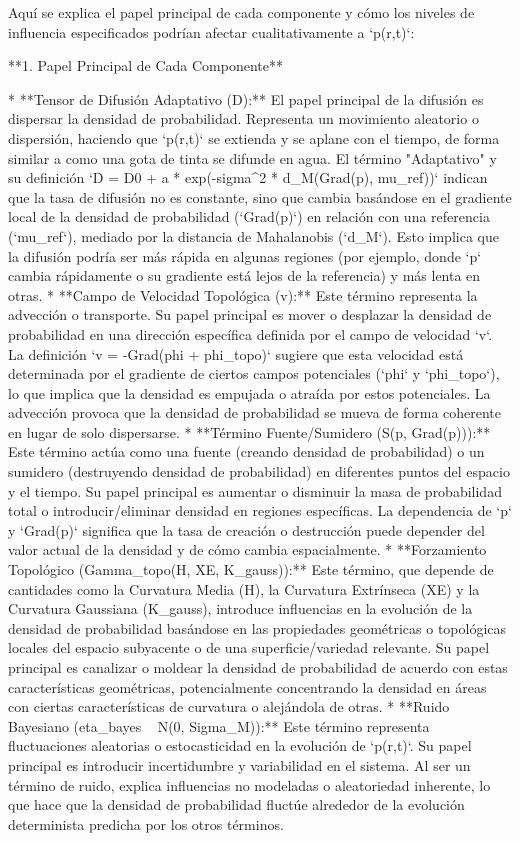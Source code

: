 \documentclass{book}
\begin{document}
Aquí se explica el papel principal de cada componente y cómo los niveles de influencia especificados podrían afectar cualitativamente a `p(r,t)`:

**1. Papel Principal de Cada Componente**

*   **Tensor de Difusión Adaptativo (D):** El papel principal de la difusión es dispersar la densidad de probabilidad. Representa un movimiento aleatorio o dispersión, haciendo que `p(r,t)` se extienda y se aplane con el tiempo, de forma similar a como una gota de tinta se difunde en agua. El término "Adaptativo" y su definición `D = D0 + a * exp(-sigma^2 * d_M(Grad(p), mu_ref))` indican que la tasa de difusión no es constante, sino que cambia basándose en el gradiente local de la densidad de probabilidad (`Grad(p)`) en relación con una referencia (`mu_ref`), mediado por la distancia de Mahalanobis (`d_M`). Esto implica que la difusión podría ser más rápida en algunas regiones (por ejemplo, donde `p` cambia rápidamente o su gradiente está lejos de la referencia) y más lenta en otras.
*   **Campo de Velocidad Topológica (v):** Este término representa la advección o transporte. Su papel principal es mover o desplazar la densidad de probabilidad en una dirección específica definida por el campo de velocidad `v`. La definición `v = -Grad(phi + phi_topo)` sugiere que esta velocidad está determinada por el gradiente de ciertos campos potenciales (`phi` y `phi_topo`), lo que implica que la densidad es empujada o atraída por estos potenciales. La advección provoca que la densidad de probabilidad se mueva de forma coherente en lugar de solo dispersarse.
*   **Término Fuente/Sumidero (S(p, Grad(p))):** Este término actúa como una fuente (creando densidad de probabilidad) o un sumidero (destruyendo densidad de probabilidad) en diferentes puntos del espacio y el tiempo. Su papel principal es aumentar o disminuir la masa de probabilidad total o introducir/eliminar densidad en regiones específicas. La dependencia de `p` y `Grad(p)` significa que la tasa de creación o destrucción puede depender del valor actual de la densidad y de cómo cambia espacialmente.
*   **Forzamiento Topológico (Gamma_topo(H, XE, K_gauss)):** Este término, que depende de cantidades como la Curvatura Media (H), la Curvatura Extrínseca (XE) y la Curvatura Gaussiana (K_gauss), introduce influencias en la evolución de la densidad de probabilidad basándose en las propiedades geométricas o topológicas locales del espacio subyacente o de una superficie/variedad relevante. Su papel principal es canalizar o moldear la densidad de probabilidad de acuerdo con estas características geométricas, potencialmente concentrando la densidad en áreas con ciertas características de curvatura o alejándola de otras.
*   **Ruido Bayesiano (eta_bayes ~ N(0, Sigma_M)):** Este término representa fluctuaciones aleatorias o estocasticidad en la evolución de `p(r,t)`. Su papel principal es introducir incertidumbre y variabilidad en el sistema. Al ser un término de ruido, explica influencias no modeladas o aleatoriedad inherente, lo que hace que la densidad de probabilidad fluctúe alrededor de la evolución determinista predicha por los otros términos.
\end{document}
